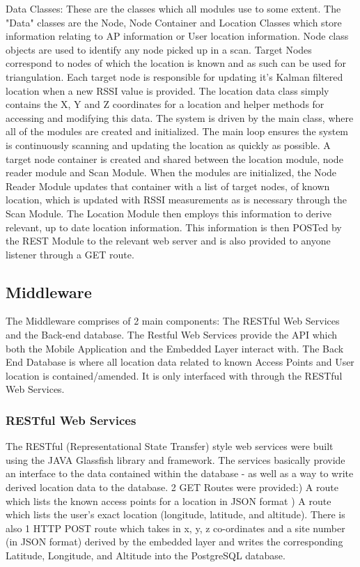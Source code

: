 \documentclass[conference]{IEEEtran}
\begin{document}
Data Classes: These are the classes which all modules use to some extent. The "Data" classes are the Node, Node Container and Location Classes which store information relating to AP information or User location information. Node class objects are used to identify any node picked up in a scan. Target Nodes correspond to nodes of which the location is known and as such can be used for triangulation. Each target node is responsible for updating it's Kalman filtered location when a new RSSI value is provided. The location data class simply contains the X, Y and Z coordinates for a location and helper methods for accessing and modifying this data. 
\newline
The system is driven by the main class, where all of the modules are created and initialized. The main loop ensures the system is continuously scanning and updating the location as quickly as possible. A target node container is created and shared between the location module, node reader module and Scan Module. When the modules are initialized, the Node Reader Module updates that container with a list of target nodes, of known location, which is updated with RSSI measurements as is necessary through the Scan Module. The Location Module then employs this information to derive relevant, up to date location information. This information is then POSTed by the REST Module to the relevant web server and is also provided to anyone listener through a GET route.

\subsection{Middleware}
The Middleware comprises of 2 main components:\newline
The RESTful Web Services and the Back-end database. The Restful Web Services provide the API which both the Mobile Application and the Embedded Layer interact with. The Back End Database is where all location data related to known Access Points and User location is contained/amended. It is only interfaced with through the RESTful Web Services.
\newline
\subsubsection{RESTful Web Services}
The RESTful (Representational State Transfer) style web services were built using the JAVA Glassfish library and framework. The services basically provide an interface to the data contained within the database - as well as a way to write derived location data to the database. 2 GET Routes were provided:) A route which lists the known access points for a location in JSON format ) A route which lists the user's exact location (longitude, latitude, and altitude).
\newline
There is also 1 HTTP POST route which takes in x, y, z co-ordinates and a site number (in JSON format) derived by the embedded layer and writes the corresponding Latitude, Longitude, and Altitude into the PostgreSQL database.
\newline
\end{document}
